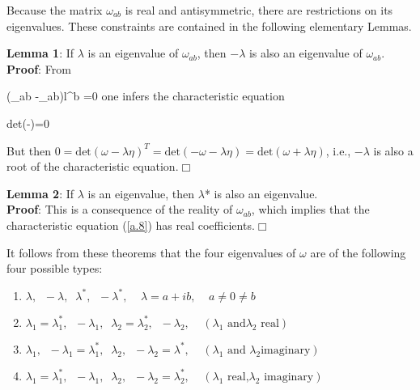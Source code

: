 Because the matrix $\omega_{ab}$ is real and antisymmetric,
there are restrictions on its eigenvalues. These constraints are
contained in the following elementary Lemmas.


{\bf Lemma 1}: If $\lambda$ is an eigenvalue of $\omega_{ab}$, then
$-\lambda$ is also an eigenvalue of $\omega_{ab}$.\\

{\bf Proof}: From

\bb
(\omega_{ab} -\lambda \eta_{ab})l^{b} =0
\label{a.7}
\ee
%
one infers the characteristic equation

\bb
\mbox{det}(\omega -\lambda \eta)=0
\label{a.8}
\ee

But then $ 0=\mbox{det}(\omega-\lambda \eta)^T
=\mbox{det}(-\omega-\lambda
\eta)=\mbox{det}(\omega +\lambda \eta)$, i.e., $-\lambda$ is
also a root of the characteristic equation.$\Box$


{\bf Lemma 2}: If $\lambda$ is an eigenvalue, then $\lambda$* is also
an eigenvalue.\\

{\bf Proof}: This is a consequence of the reality of $\omega_{ab}$,
which implies that the characteristic equation (\ref{a.8}) has
real coefficients.$\Box$

\vspace{1cm}

It follows from these theorems that the four eigenvalues of
$\omega$ are of the following four possible types:

\begin{enumerate}
\item $ \lambda,\;\; -\lambda,\;\; \lambda^{*},\;\;
-\lambda^{*},\;\;\;\; \lambda=a +ib,\;\;\;\; a\neq 0
\neq b$

\item $\lambda_1 = \lambda_1^{*},\;\; -\lambda_1,\;\; \lambda_2
= \lambda_2^{*},\;\; -\lambda_2,\;\; \;\;(\mbox{$\lambda_1$  and
$\lambda_2$  real})$

\item $ \lambda_1,\;\; -\lambda_1 = \lambda_1^{*},\;\; \lambda_2,\;\;
-\lambda_2 =  \lambda^{*} ,\;\;\;\;(\mbox{$\lambda_1$ and $\lambda_2$
imaginary})$

\item $ \lambda_1 =\lambda_1^{*},\;\;  -\lambda_1,\;\; \lambda_2,\;\;
-\lambda_2 =\lambda_2^{*},\;\;\;\; (\mbox{$\lambda_1$ real,
$\lambda_2$ imaginary})$
\end{enumerate}

